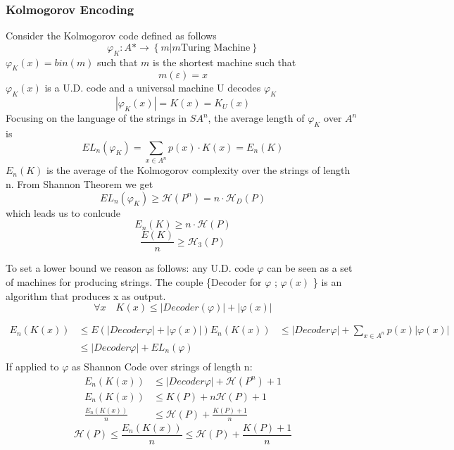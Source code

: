     \subsubsection*{Kolmogorov Encoding}
    Consider the Kolmogorov code defined as follows
    \[ 
        \varphi_K: A* \longrightarrow \left\{ m | m \text{Turing Machine} \right\} 
    \]
    $ \varphi_K(x) = bin(m)$ such that $m$ is the shortest machine such that \[ 
         m(\varepsilon) = x
    \] 
    $\varphi_K(x)$ is a U.D. code and a universal machine U decodes $\varphi_K$
    \[ 
        |\varphi_K(x)| = K(x) = K_U(x) 
    \]
    Focusing on the language of the strings in $SA^n$, the average length of $\varphi_K$ over $A^n$ is
    \[ 
        EL_n(\varphi_K) = \sum_{x\in A^n}{p(x)\cdot K(x)} = E_n(K)
    \]
    $E_n(K)$ is the average of the Kolmogorov complexity over the strings of length n.
    From Shannon Theorem we get
    \[ 
        EL_n(\varphi_K) \geq \mathcal{H}(P^n) = n\cdot \mathcal{H}_D(P) 
    \]which leads us to conlcude
    \[ 
        E_n(K)\geq n\cdot \mathcal{H}(P) 
    \]
    \[ 
        \frac{E(K) }{n} \geq \mathcal{H}_3(P)
    \]

    To set a lower bound we reason as follows: any U.D. code $\varphi$ can be seen as a set of machines for producing strings. The couple \{Decoder for $\varphi$ ; $\varphi(x)$ \} is an algorithm that produces x as output.
    \[ 
        \forall x\quad K(x) \leq |Decoder(\varphi)|+|\varphi(x)| 
    \]

    \begin{align*}
        E_n(K(x)) &\leq E(|Decoder \varphi| +|\varphi(x)|)
        E_n(K(x)) &\leq |Decoder \varphi|+ \sum_{x\in A^n}{p(x)|\varphi(x)|}\\
        & \leq |Decoder \varphi| + EL_n(\varphi)\\
    \end{align*}
    If applied to $\varphi$ as Shannon Code over strings of length n:
    \begin{align*}
        E_n(K(x)) &\leq |Decoder \varphi| + \mathcal{H}(P^n)+1\\
        E_n(K(x)) &\leq K(P) + n\mathcal{H}(P)+1\\
        \frac{E_n(K(x))}{n} &\leq \mathcal{H}(P) + \frac{K(P)+1}{n}
    \end{align*}
    \[ 
        \mathcal{H}(P)\leq \frac{E_n(K(x))}{n} \leq \mathcal{H}(P) + \frac{K(P)+1}{n} 
    \]
    

